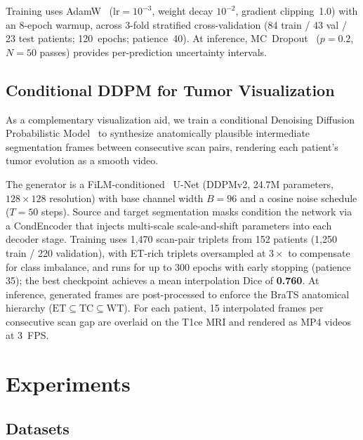 \documentclass[conference]{IEEEtran}
\begin{document}
Training uses AdamW~\cite{loshchilov2019adamw} ($\mathrm{lr}=10^{-3}$, weight decay $10^{-2}$, gradient clipping~1.0) with an 8-epoch warmup, across 3-fold stratified cross-validation (84 train / 43 val / 23 test patients; 120~epochs; patience~40). At inference, MC~Dropout~\cite{gal2016dropout} ($p=0.2$, $N=50$ passes) provides per-prediction uncertainty intervals.

\subsection{Conditional DDPM for Tumor Visualization}

As a complementary visualization aid, we train a conditional Denoising Diffusion Probabilistic Model~\cite{ho2020ddpm} to synthesize anatomically plausible intermediate segmentation frames between consecutive scan pairs, rendering each patient's tumor evolution as a smooth video.

The generator is a FiLM-conditioned~\cite{perez2018film} U-Net (DDPMv2, 24.7M parameters, $128{\times}128$ resolution) with base channel width $B=96$ and a cosine noise schedule ($T=50$ steps). Source and target segmentation masks condition the network via a CondEncoder that injects multi-scale scale-and-shift parameters into each decoder stage. Training uses 1,470 scan-pair triplets from 152 patients (1,250 train / 220 validation), with ET-rich triplets oversampled at $3{\times}$ to compensate for class imbalance, and runs for up to 300 epochs with early stopping (patience 35); the best checkpoint achieves a mean interpolation Dice of \textbf{0.760}. At inference, generated frames are post-processed to enforce the BraTS anatomical hierarchy ($\text{ET}\subseteq\text{TC}\subseteq\text{WT}$). For each patient, 15 interpolated frames per consecutive scan gap are overlaid on the T1ce MRI and rendered as MP4 videos at 3~FPS.


\section{Experiments}
\label{sec:experiments}
\subsection{Datasets}
\end{document}
